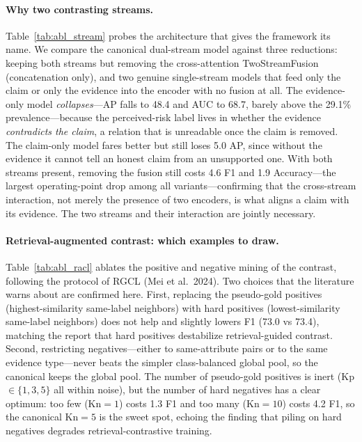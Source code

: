 \documentclass[11pt]{article}
\begin{document}
\paragraph{Why two contrasting streams.}
Table~\ref{tab:abl_stream} probes the architecture that gives the framework its
name. We compare the canonical dual-stream model against three reductions: keeping
both streams but removing the cross-attention TwoStreamFusion (concatenation
only), and two genuine single-stream models that feed only the claim or only the
evidence into the encoder with no fusion at all. The evidence-only model
\emph{collapses}---AP falls to 48.4 and AUC to 68.7, barely above the 29.1\%
prevalence---because the perceived-risk label lives in whether the evidence
\emph{contradicts the claim}, a relation that is unreadable once the claim is
removed. The claim-only model fares better but still loses 5.0 AP, since without
the evidence it cannot tell an honest claim from an unsupported one. With both
streams present, removing the fusion still costs 4.6 F1 and 1.9 Accuracy---the
largest operating-point drop among all variants---confirming that the cross-stream
interaction, not merely the presence of two encoders, is what aligns a claim with
its evidence. The two streams and their interaction are jointly necessary.

\paragraph{Retrieval-augmented contrast: which examples to draw.}
Table~\ref{tab:abl_racl} ablates the positive and negative mining of the contrast,
following the protocol of RGCL (Mei et al.\ 2024). Two choices that the literature
warns about are confirmed here. First, replacing the pseudo-gold positives
(highest-similarity same-label neighbors) with hard positives (lowest-similarity
same-label neighbors) does not help and slightly lowers F1 (73.0 vs 73.4),
matching the report that hard positives destabilize retrieval-guided contrast.
Second, restricting negatives---either to same-attribute pairs or to the same
evidence type---never beats the simpler class-balanced global pool, so the
canonical keeps the global pool. The number of pseudo-gold positives is inert
(Kp $\in\{1,3,5\}$ all within noise), but the number of hard negatives has a clear
optimum: too few (Kn$=1$) costs 1.3 F1 and too many (Kn$=10$) costs 4.2 F1, so the
canonical Kn$=5$ is the sweet spot, echoing the finding that piling on hard
negatives degrades retrieval-contrastive training.
\end{document}
